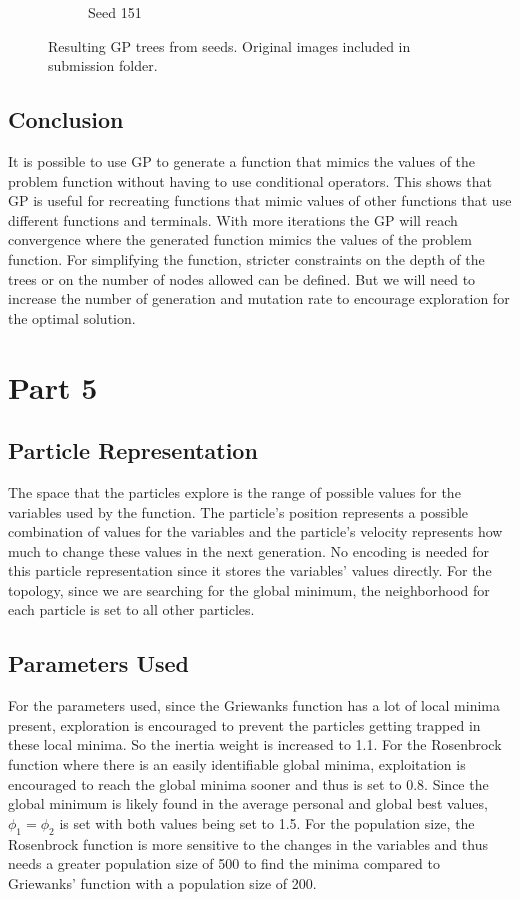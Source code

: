 \documentclass{article}
\begin{document}
\begin{figure}[h!]
\begin{subfigure}[b]{0.49\linewidth}
		\caption{Seed 151}
	\end{subfigure}
	\caption{Resulting GP trees from seeds. Original images included in submission folder.}
\end{figure}
\subsection*{Conclusion}
It is possible to use GP to generate a function that mimics the values of the problem function without having to use conditional operators. This shows that GP is useful for recreating functions that mimic values of other functions that use different functions and terminals. With more iterations the GP will reach convergence where the generated function mimics the values of the problem function. For simplifying the function, stricter constraints on the depth of the trees or on the number of nodes allowed can be defined. But we will need to increase the number of generation and mutation rate to encourage exploration for the optimal solution. 
\section*{Part 5}
\subsection*{Particle Representation}
The space that the particles explore is the range of possible values for the variables used by the function. The particle’s position represents a possible combination of values for the variables and the particle’s velocity represents how much to change these values in the next generation. No encoding is needed for this particle representation since it stores the variables’ values directly. For the topology, since we are searching for the global minimum, the neighborhood for each particle is set to all other particles. \par
\subsection*{Parameters Used}
For the parameters used, since the Griewanks function has a lot of local minima present, exploration is encouraged to prevent the particles getting trapped in these local minima. So the inertia weight is increased to 1.1. For the Rosenbrock function where there is an easily identifiable global minima, exploitation is encouraged to reach the global minima sooner and thus is set to 0.8. Since the global minimum is likely found in the average personal and global best values, $\phi_1 = \phi_2$ is set with both values being set to 1.5. For the population size, the Rosenbrock function is more sensitive to the changes in the variables and thus needs a greater population size of 500 to find the minima compared to Griewanks’ function with a population size of 200. \par
\end{document}
